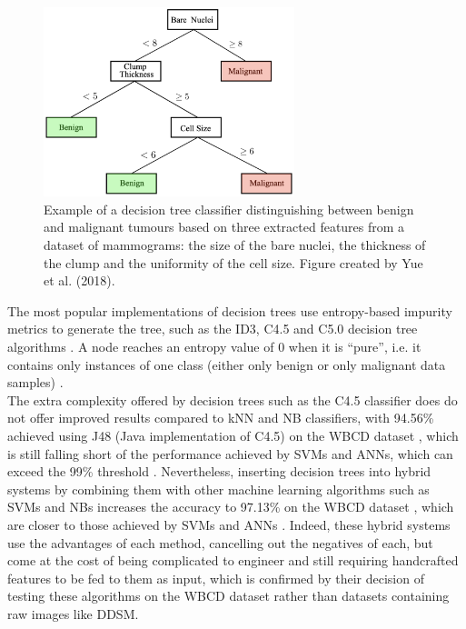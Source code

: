 \begin{figure}[ht]
\centerline{\includegraphics[width=0.65\textwidth]{figures/litsurvey/dt.png}}
\caption{\label{fig:litsurvey-dt-example}Example of a decision tree classifier distinguishing between benign and malignant tumours based on three extracted features from a dataset of mammograms: the size of the bare nuclei, the thickness of the clump and the uniformity of the cell size. Figure created by Yue et al. (2018).}
\end{figure}

The most popular implementations of decision trees use entropy-based impurity metrics to generate the tree, such as the ID3, C4.5 and C5.0 decision tree algorithms \citep{Yue2018}. A node reaches an entropy value of 0 when it is ``pure'', i.e. it contains only instances of one class (either only benign or only malignant data samples) \citep{Geron2019}.\\

The extra complexity offered by decision trees such as the C4.5 classifier does do not offer improved results compared to kNN and NB classifiers, with 94.56\% achieved using J48 (Java implementation of C4.5) on the WBCD dataset \citep{Sumbaly2014}, which is still falling short of the performance achieved by SVMs and ANNs, which can exceed the 99\% threshold \citep{Yue2018}. Nevertheless, inserting decision trees into hybrid systems by combining them with other machine learning algorithms such as SVMs and NBs increases the accuracy to 97.13\% on the WBCD dataset \citep{Kumar2017}, which are closer to those achieved by SVMs and ANNs \citep{Yue2018}. Indeed, these hybrid systems use the advantages of each method, cancelling out the negatives of each, but come at the cost of being complicated to engineer and still requiring handcrafted features to be fed to them as input, which is confirmed by their decision of testing these algorithms on the WBCD dataset rather than datasets containing raw images like DDSM.

